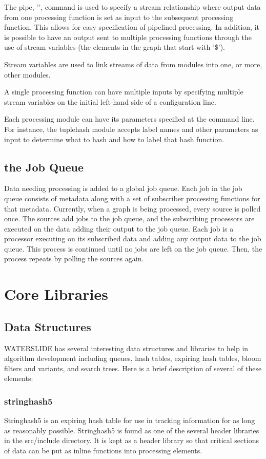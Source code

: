 \documentclass[11pt]{article}
\begin{document}
The pipe, '\textbar', command is used to specify a stream relationship where 
output data from one processing function is set as input to the subsequent 
processing  function.  This allows for easy specification of pipelined 
processing.  In addition, it is possible to have an output sent to multiple 
processing  functions through the use of stream variables (the elements in the 
graph that start with '\$'). 

Stream variables are used to link streams of data from modules into one, or 
more, other modules. 

A single processing function can have multiple inputs by specifying multiple 
stream variables on the initial left-hand side of a configuration line. 

Each processing module can have its parameters specified at the command line.  
For instance, the tuplehash module accepts label names and other parameters as 
input to determine what to hash and how to label that hash function.

\subsection{the Job Queue}
Data needing processing is added to a global job queue.  Each job in the 
job queue consists of metadata along with a set of subscriber processing 
functions for that metadata. Currently, when a graph is being processed, every
source is polled once. The sources add jobs to the job queue, and the 
subscribing processors are executed on the data adding their output to the job 
queue.  Each job is a processor executing on its subscribed data and adding any
output data to the job queue.  This process is continued until no jobs are left
on the job queue. Then, the process repeats by polling the sources again.

\section{Core Libraries}
\subsection{Data Structures}
WATERSLIDE has several interesting data structures and libraries to help in 
algorithm development including queues, hash tables, expiring hash tables, 
bloom filters and variants, and search trees.  Here is a brief description of 
several of these elements:

\subsubsection{stringhash5}
Stringhash5 is an expiring hash table for use in tracking information for as
long as reasonably possible.  Stringhash5 is found as one of the several header
libraries in the src/include directory.  It is kept as a header library so 
that critical sections of data can be put as inline functions into processing
elements.
\end{document}
